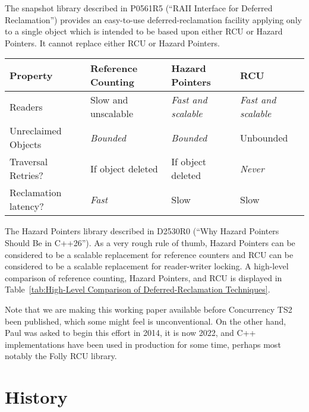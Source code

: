 The snapshot library described in P0561R5 (``RAII Interface for Deferred
Reclamation'') provides an easy-to-use deferred-reclamation facility
applying only to a single object which is intended to be based upon
either RCU or Hazard Pointers.
It cannot replace either RCU or Hazard Pointers.

\begin{table*}
\renewcommand*{\arraystretch}{1.25}
\footnotesize
\centering
\begin{tabular}{l|lll}
	Property
		& Reference Counting
			& Hazard Pointers
				& RCU \\
	\hline
	\hline
	Readers
		& Slow and unscalable
			& \emph{Fast and scalable}
				& \emph{Fast and scalable} \\
	\hline
	Unreclaimed Objects
		& \emph{Bounded}
			& \emph{Bounded}
				& Unbounded \\
	\hline
	Traversal Retries?
		& If object deleted
			& If object deleted
				& \emph{Never} \\
	\hline
	Reclamation latency?
		& \emph{Fast}
			& Slow
				& Slow \\
\end{tabular}
\caption{High-Level Comparison of Deferred-Reclamation Techniques}
\label{tab:High-Level Comparison of Deferred-Reclamation Techniques}
\end{table*}

The Hazard Pointers library described in D2530R0 (``Why Hazard Pointers
Should Be in C++26'').
As a very rough rule of thumb, Hazard Pointers can be considered to be
a scalable replacement for reference counters and RCU can be considered
to be a scalable replacement for reader-writer locking.
A high-level comparison of reference counting, Hazard Pointers, and RCU
is displayed in
Table~\ref{tab:High-Level Comparison of Deferred-Reclamation Techniques}.

Note that we are making this working paper available before Concurrency
TS2 been published, which some might feel is unconventional.
On the other hand, Paul was asked to begin this effort in 2014, it is now
2022, and C++ implementations have been used in production for some time,
perhaps most notably the Folly RCU library.

\section{History}
\label{sec:History}

